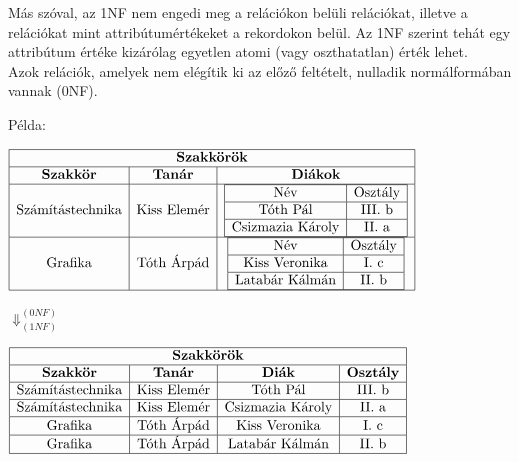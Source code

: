 \documentclass[tikz,12pt,margin=0px]{article}
\begin{document}
{    \noindent Más szóval, az 1NF nem engedi meg a relációkon belüli relációkat, illetve a relációkat mint attribútumértékeket a rekordokon belül. Az 1NF szerint tehát egy attribútum értéke kizárólag egyetlen atomi (vagy oszthatatlan) érték lehet.\\

    \noindent Azok relációk, amelyek nem elégítik ki az előző feltételt, nulladik normálformában vannak (0NF).\\

    {\small
    \noindent Példa:
    \begin{center}
        $\begin{array}{|c|c|c|}
            \hline
            \multicolumn{3}{|c|}{\textbf{Szakkörök}} \\ \hline
            \textbf{Szakkör} & \textbf{Tanár} & \textbf{Diákok} \\ \hline
            \text{Számítástechnika} & \text{Kiss Elemér} &
                \begin{array}{|c|c|}
                \hline
                \text{Név} & \text{Osztály} \\ \hline
                \text{Tóth Pál} & \text{III. b} \\ \hline
                \text{Csizmazia Károly} & \text{II. a} \\ \hline
                \end{array} \\ \hline
            \text{Grafika} & \text{Tóth Árpád} &
                \begin{array}{|c|c|}
                \hline
                \text{Név} & \text{Osztály} \\ \hline
                \text{Kiss Veronika} & \text{I. c} \\ \hline
                \text{Latabár Kálmán} & \text{II. b} \\ \hline
                \end{array} \\ \hline
            \end{array}$
            \begin{center}
                $\Downarrow^{(0NF)}_{(1NF)}$
            \end{center}
            $\begin{array}{|c|c|c|c|}
                \hline
                \multicolumn{4}{|c|}{\textbf{Szakkörök}} \\ \hline
                \textbf{Szakkör} & \textbf{Tanár} & \textbf{Diák} & \textbf{Osztály} \\ \hline
                \text{Számítástechnika} & \text{Kiss Elemér} & \text{Tóth Pál} & \text{III. b} \\ \hline
                \text{Számítástechnika} & \text{Kiss Elemér} & \text{Csizmazia Károly} & \text{II. a} \\ \hline
                \text{Grafika} & \text{Tóth Árpád} & \text{Kiss Veronika} & \text{I. c} \\ \hline
                \text{Grafika} & \text{Tóth Árpád} & \text{Latabár Kálmán} & \text{II. b} \\ \hline
        \end{array}$
    \end{center}
    }

}
\end{document}
